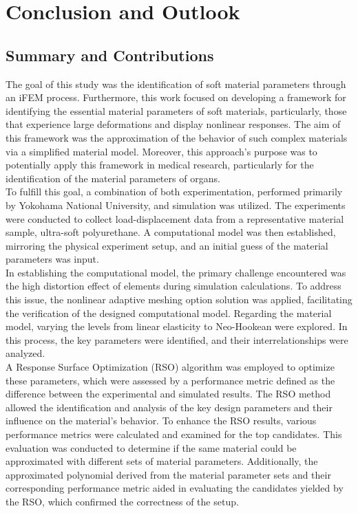 
\chapter{Conclusion and Outlook} %

\label{Chapter7} %

\section{Summary and Contributions}
The goal of this study was the identification of soft material parameters through 
an iFEM process. Furthermore, this work focused on developing a framework for identifying the 
essential material parameters of soft materials, particularly, those that experience 
large deformations and display nonlinear responses. The aim of this framework was the 
approximation of the behavior of such complex materials via a simplified material model. 
Moreover, this approach's purpose was to potentially apply this framework in medical research,
particularly for the identification of the material parameters of organs.\\

To fulfill this goal, a combination of both experimentation, performed primarily by Yokohama National University, 
and simulation was utilized. The experiments were conducted to collect load-displacement data from
a representative material sample, ultra-soft polyurethane. A computational model was then 
established, mirroring the physical experiment setup, and an initial guess of the material 
parameters was input.\\

In establishing the computational model, the primary challenge encountered was the 
high distortion effect of elements during simulation calculations. To address this issue, the nonlinear adaptive 
meshing option solution was applied, facilitating the verification of the designed 
computational model. Regarding the material model, varying the levels from linear elasticity to 
Neo-Hookean were explored. In this process, the key parameters were identified, and their interrelationships were analyzed.\\

A Response Surface Optimization (RSO) algorithm was employed to optimize these 
parameters, which were assessed by a performance metric defined as the difference between the 
experimental and simulated results. The RSO method allowed the identification and analysis of the 
key design parameters and their influence on the material's behavior. 
To enhance the RSO results, various performance metrics were calculated and examined for 
the top candidates. This evaluation was conducted to determine if the same material could be approximated 
with different sets of material parameters. Additionally, the approximated polynomial derived 
from the material parameter sets and their corresponding performance metric aided in evaluating the 
candidates yielded by the RSO, which confirmed the correctness of the setup.\\

